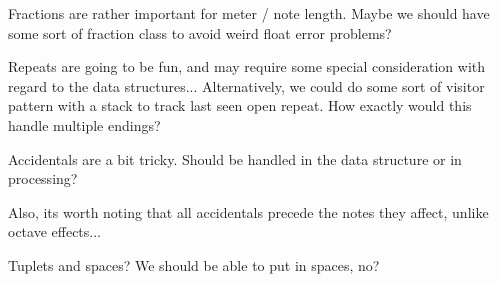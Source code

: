 Fractions are rather important for meter / note length. Maybe we should have some sort of fraction class to avoid weird float error problems?

Repeats are going to be fun, and may require some special consideration with regard to the data structures... Alternatively, we could do some sort of visitor pattern with a stack to track last seen open repeat. How exactly would this handle multiple endings?

Accidentals are a bit tricky. Should be handled in the data structure or in processing?

Also, its worth noting that all accidentals precede the notes they affect, unlike octave effects...

Tuplets and spaces? We should be able to put in spaces, no?
